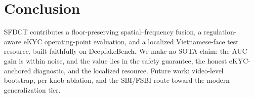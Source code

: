 \documentclass[conference]{IEEEtran}
\begin{document}
\section{Conclusion}
SFDCT contributes a floor-preserving spatial--frequency fusion, a regulation-aware eKYC operating-point
evaluation, and a localized Vietnamese-face test resource, built faithfully on DeepfakeBench. We make no
SOTA claim: the AUC gain is within noise, and the value lies in the safety guarantee, the honest
eKYC-anchored diagnostic, and the localized resource. Future work: video-level bootstrap, per-knob
ablation, and the SBI/FSBI route toward the modern generalization tier.



\end{document}
